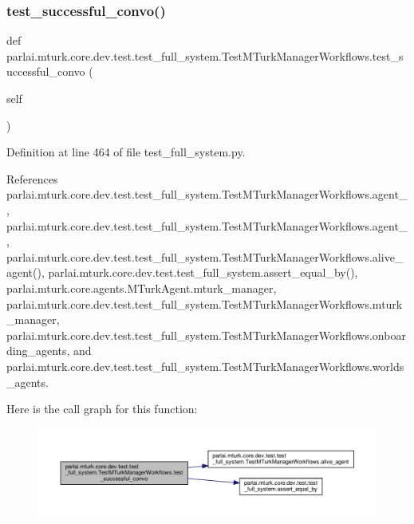 \subsubsection{\texorpdfstring{test\+\_\+successful\+\_\+convo()}{test\_successful\_convo()}}
{\footnotesize\ttfamily def parlai.\+mturk.\+core.\+dev.\+test.\+test\+\_\+full\+\_\+system.\+Test\+M\+Turk\+Manager\+Workflows.\+test\+\_\+successful\+\_\+convo (\begin{DoxyParamCaption}\item[{}]{self }\end{DoxyParamCaption})}



Definition at line 464 of file test\+\_\+full\+\_\+system.\+py.



References parlai.\+mturk.\+core.\+dev.\+test.\+test\+\_\+full\+\_\+system.\+Test\+M\+Turk\+Manager\+Workflows.\+agent\+\_, parlai.\+mturk.\+core.\+dev.\+test.\+test\+\_\+full\+\_\+system.\+Test\+M\+Turk\+Manager\+Workflows.\+agent\+\_, parlai.\+mturk.\+core.\+dev.\+test.\+test\+\_\+full\+\_\+system.\+Test\+M\+Turk\+Manager\+Workflows.\+alive\+\_\+agent(), parlai.\+mturk.\+core.\+dev.\+test.\+test\+\_\+full\+\_\+system.\+assert\+\_\+equal\+\_\+by(), parlai.\+mturk.\+core.\+agents.\+M\+Turk\+Agent.\+mturk\+\_\+manager, parlai.\+mturk.\+core.\+dev.\+test.\+test\+\_\+full\+\_\+system.\+Test\+M\+Turk\+Manager\+Workflows.\+mturk\+\_\+manager, parlai.\+mturk.\+core.\+dev.\+test.\+test\+\_\+full\+\_\+system.\+Test\+M\+Turk\+Manager\+Workflows.\+onboarding\+\_\+agents, and parlai.\+mturk.\+core.\+dev.\+test.\+test\+\_\+full\+\_\+system.\+Test\+M\+Turk\+Manager\+Workflows.\+worlds\+\_\+agents.

Here is the call graph for this function\+:
\nopagebreak
\begin{figure}[H]
\begin{center}
\leavevmode
\includegraphics[width=350pt]{classparlai_1_1mturk_1_1core_1_1dev_1_1test_1_1test__full__system_1_1TestMTurkManagerWorkflows_a584e2c301ed81a4cd3b68520ed6e0096_cgraph}
\end{center}
\end{figure}


